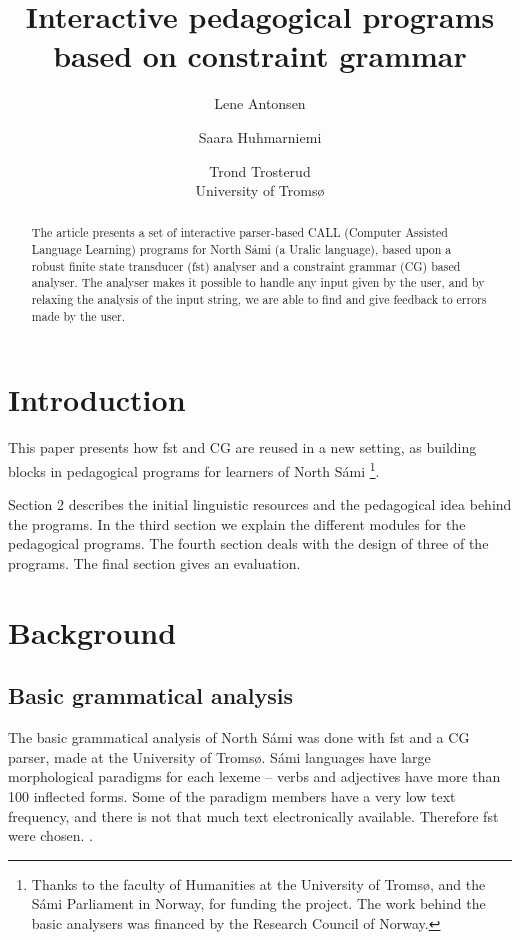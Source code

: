 \documentclass[11pt]{article}
\begin{document}
\title{Interactive pedagogical programs based on constraint grammar}

\author{Lene Antonsen  \and
              Saara Huhmarniemi \and Trond Trosterud \\ University of Tromsø}

 
\maketitle

\begin{abstract}
The article presents a set of interactive parser-based CALL (Computer Assisted Language Learning) programs for North Sámi (a Uralic language), based upon a robust finite state transducer (fst) analyser and a constraint grammar (CG) based analyser. The analyser makes it possible to handle any input given by the user, and by relaxing the analysis of the input string, we are able to find and give feedback to errors made by the user. 
\end{abstract}

\section{Introduction}
This paper presents how fst and CG are reused in a new setting, as building blocks in pedagogical programs for learners of North Sámi \footnote{Thanks to the faculty of Humanities at the University of Tromsø, and the Sámi Parliament in Norway, for funding the project. The work behind the basic analysers was financed by the Research Council of Norway.}. 

Section 2 describes the initial linguistic resources and the pedagogical idea behind the programs. In the third section we explain the different modules for the pedagogical programs. The fourth section deals with the design of three of the programs. The final section gives an evaluation.


\section{Background}

\subsection{Basic grammatical analysis}

The basic grammatical analysis of North Sámi was done with fst and a CG parser, made at the University of Tromsø. Sámi languages have large morphological paradigms for each lexeme -- verbs and adjectives have more than 100 inflected forms. Some of the paradigm members have a very low text frequency, and there is not that much text electronically available. Therefore fst were chosen. \cite{Trosterud:07}.  
\end{document}
